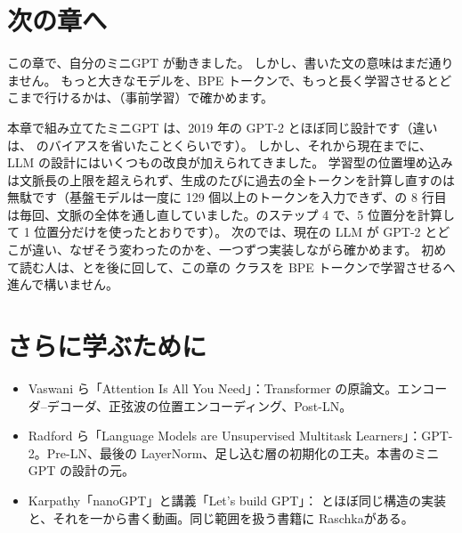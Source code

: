 \section*{次の章へ}

この章で、自分のミニGPT が動きました。
しかし、書いた文の意味はまだ通りません。
もっと大きなモデルを、BPE トークンで、もっと長く学習させるとどこまで行けるかは、（事前学習）で確かめます。

本章で組み立てたミニGPT は、2019 年の GPT-2 とほぼ同じ設計です（違いは、 のバイアスを省いたことくらいです）。
しかし、それから現在までに、LLM の設計にはいくつもの改良が加えられてきました。
学習型の位置埋め込みは文脈長の上限を超えられず、生成のたびに過去の全トークンを計算し直すのは無駄です（基盤モデルは一度に 129 個以上のトークンを入力できず、の 8 行目は毎回、文脈の全体を通し直していました。のステップ 4 で、5 位置分を計算して 1 位置分だけを使ったとおりです）。
次のでは、現在の LLM が GPT-2 とどこが違い、なぜそう変わったのかを、一つずつ実装しながら確かめます。
初めて読む人は、とを後に回して、この章の  クラスを BPE トークンで学習させるへ進んで構いません。

\section*{さらに学ぶために}

\begin{itemize}
\item Vaswani ら「Attention Is All You Need」\cite{vaswani2017attention}：Transformer の原論文。エンコーダ–デコーダ、正弦波の位置エンコーディング、Post-LN。
\item Radford ら「Language Models are Unsupervised Multitask Learners」\cite{radford2019language}：GPT-2。Pre-LN、最後の LayerNorm、足し込む層の初期化の工夫。本書のミニGPT の設計の元。
\item Karpathy「nanoGPT」\cite{karpathy2022nanogpt}と講義「Let's build GPT」\cite{karpathy2022zerotohero}： とほぼ同じ構造の実装と、それを一から書く動画。同じ範囲を扱う書籍に Raschka\cite{raschka2024build}がある。
\end{itemize}


